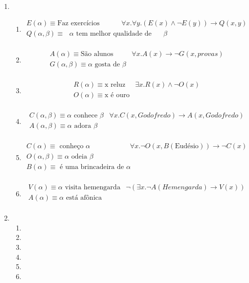 \begin{enumerate}
		\item
		\begin{enumerate}
			\item 
			\[
			 \begin{array}{l|l}    
			 	E(\alpha) \equiv \text{Faz exerc\'icios} & \forall x. \forall y.(E(x) \land \neg E(y)) \to Q(x, y) \\
			 	Q(\alpha, \beta) \equiv \text{ $\alpha$ tem melhor qualidade de vida do que $\beta$} & \\
			 \end{array}
			\]
			\item
			\[
			 \begin{array}{l|l}    
			 	A(\alpha) \equiv \text{S\~ao alunos} & \forall x. A(x) \to \neg G(x, provas) \\
			 	G(\alpha, \beta) \equiv \alpha \text{ gosta de } \beta & \\
			 \end{array}
			\] 
			\item
			\[
			 \begin{array}{l|l}    
			 	R(\alpha) \equiv \text{x reluz} & \exists x. R(x) \land \neg O(x) \\
			 	O(\alpha) \equiv \text{x \'e ouro} & \\
			 \end{array}
			\] 
			\item
			\[
		 	\begin{array}{l|l}    
			 	C(\alpha, \beta) \equiv \alpha \text{ conhece } \beta & \forall x. C(x, Godofredo) \to A (x, Godofredo) \\
			 	A(\alpha, \beta) \equiv \alpha \text{ adora } \beta & \\
		 	\end{array}
			\] 
			\item
			\[
			 \begin{array}{l|l}    
			 	C(\alpha) \equiv \text{ conhe\c{c}o } \alpha & \forall x. \neg O(x, B(\text{Eud\'esio})) \to \neg C(x) \\
			 	O(\alpha, \beta) \equiv \alpha \text{ odeia } \beta & \\
			 	B(\alpha) \equiv \text{ \'e uma brincadeira de } \alpha & \\
			 \end{array}
		    \]
			\item 
			\[
			 \begin{array}{l|l}    
			 	V(\alpha) \equiv \alpha \text{ visita hemengarda}& \neg(\exists x. \neg A(Hemengarda) \to V(x))  \\
			 	A(\alpha) \equiv \alpha \text{ est\'a af\^onica} & \\
			 \end{array}
	 		\]
		\end{enumerate}	
		
		\item
		\begin{enumerate}
			\item
			\item
			\item
			\item
			\item
			\item
		\end{enumerate}
	\end{enumerate}

